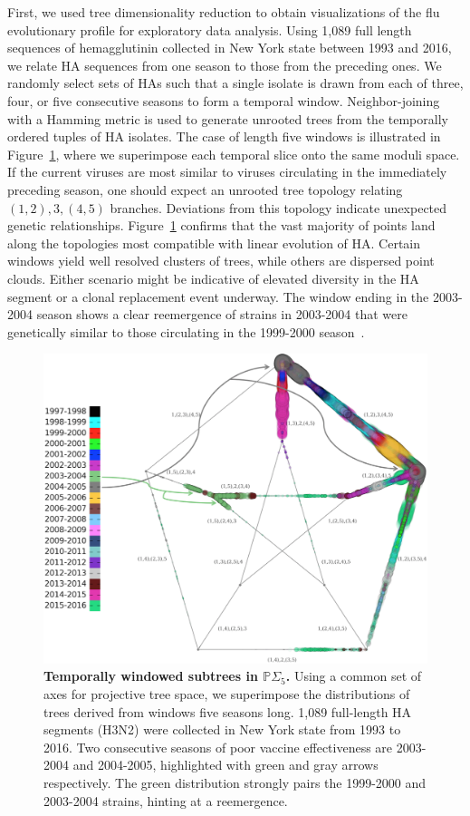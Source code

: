 \documentclass[a4paper,11pt]{article}
\begin{document}
First, we used tree dimensionality reduction to obtain visualizations of the flu evolutionary profile for exploratory data analysis.
Using 1,089 full length sequences of hemagglutinin collected in New York state between 1993 and 2016, we relate HA sequences from one season to those from the preceding ones.
We randomly select sets of HAs such that a single isolate is drawn from each of three, four, or five consecutive seasons to form a temporal window.
Neighbor-joining with a Hamming metric is used to generate unrooted trees from the temporally ordered tuples of HA isolates.
The case of length five windows is illustrated in Figure~\ref{fig:flu_quint}, where we superimpose each temporal slice onto the same moduli space.
If the current viruses are most similar to viruses circulating in the immediately preceding season, one should expect an unrooted tree topology relating $(1,2),3,(4,5)$ branches.
Deviations from this topology indicate unexpected genetic relationships.
Figure~\ref{fig:flu_quint} confirms that the vast majority of points land along the topologies most compatible with linear evolution of HA.
Certain windows yield well resolved clusters of trees, while others are dispersed point clouds.
Either scenario might be indicative of elevated diversity in the HA segment or a clonal replacement event underway.
The window ending in the 2003-2004 season shows a clear reemergence of strains in 2003-2004 that were genetically similar to those circulating in the 1999-2000 season~\cite{holmes2005whole}.

\begin{figure}
    \centering
    \includegraphics[width=6in]{../figures/influenza_quint.png}
    \caption{{\bf Temporally windowed subtrees in $\mathbb{P}\Sigma_5$.} Using a common set of axes for projective tree space, we superimpose the distributions of trees derived from windows five seasons long. 1,089 full-length HA segments (H3N2) were collected in New York state from 1993 to 2016. Two consecutive seasons of poor vaccine effectiveness are 2003-2004 and 2004-2005, highlighted with green and gray arrows respectively. The green distribution strongly pairs the 1999-2000 and 2003-2004 strains, hinting at a reemergence.}
    \label{fig:flu_quint}
\end{figure}
\end{document}
